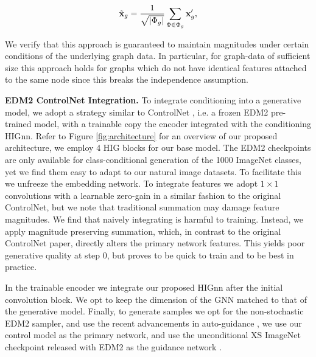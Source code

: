 
\begin{equation}
\Tilde{\mathbf{x}}_g = \frac{1}{\sqrt{|\Phi_g|}} \sum_{\Phi \in \Phi_g} \mathbf{x}'_g,
\label{eq:meta_path}
\end{equation}

We verify that this approach is guaranteed to maintain magnitudes under certain conditions of the underlying graph data. In particular, for graph-data of sufficient size this approach holds for graphs which do not have identical features attached to the same node since this breaks the independence assumption. 


\textbf{EDM2 ControlNet Integration.} To integrate conditioning into a generative model, we adopt a strategy similar to ControlNet \cite{zhang_adding_2023}, i.e. a frozen EDM2 pre-trained model, with a trainable copy the encoder integrated with the conditioning HIGnn. Refer to Figure \ref{fig:architecture} for an overview of our proposed architecture, we employ 4 HIG blocks for our base model. The EDM2 checkpoints are only available for class-conditional generation of the 1000 ImageNet classes, yet we find them easy to adapt to our natural image datasets.  To facilitate this we unfreeze the embedding network. To integrate features we adopt $1\times1$ convolutions with a learnable zero-gain in a similar fashion to the original ControlNet, but we note that traditional summation may damage feature magnitudes. We find that naively integrating is harmful to training. Instead, we apply magnitude preserving summation, which, in contrast to the original ControlNet paper, directly alters the primary network features. This yields poor generative quality at step 0, but proves to be quick to train and to be best in practice.

In the trainable encoder we integrate our proposed HIGnn after the initial convolution block. We opt to keep the dimension of the GNN matched to that of the generative model. Finally, to generate samples we opt for the non-stochastic EDM2 sampler, and use the recent advancements in auto-guidance \cite{karras_guiding_2024}, we use our control model as the primary network, and use the unconditional XS ImageNet checkpoint released with EDM2 as the guidance network \cite{karras_analyzing_2024, karras_guiding_2024}. 

